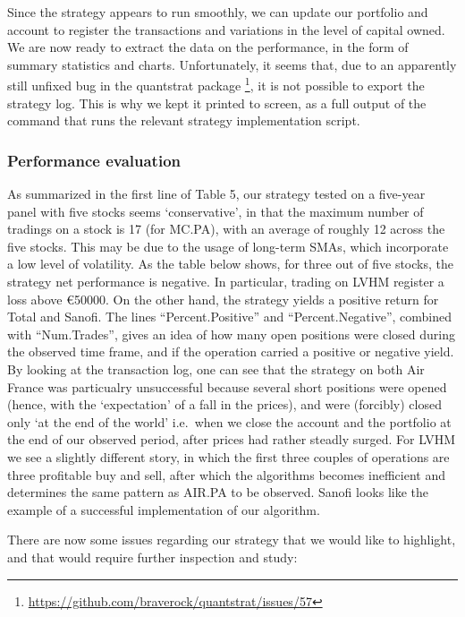 \documentclass[
  11pt,
]{article}
\begin{document}
Since the strategy appears to run smoothly, we can update our portfolio
and account to register the transactions and variations in the level of
capital owned. We are now ready to extract the data on the performance,
in the form of summary statistics and charts. Unfortunately, it seems
that, due to an apparently still unfixed bug in the quantstrat package
\footnote{\url{https://github.com/braverock/quantstrat/issues/57}}, it
is not possible to export the strategy log. This is why we kept it
printed to screen, as a full output of the command that runs the
relevant strategy implementation script.

\hypertarget{performance-evaluation}{%
\subsubsection{Performance evaluation}\label{performance-evaluation}}

As summarized in the first line of Table 5, our strategy tested on a
five-year panel with five stocks seems `conservative', in that the
maximum number of tradings on a stock is 17 (for MC.PA), with an average
of roughly 12 across the five stocks. This may be due to the usage of
long-term SMAs, which incorporate a low level of volatility. As the
table below shows, for three out of five stocks, the strategy net
performance is negative. In particular, trading on LVHM register a loss
above €50000. On the other hand, the strategy yields a positive return
for Total and Sanofi. The lines ``Percent.Positive'' and
``Percent.Negative'', combined with ``Num.Trades'', gives an idea of how
many open positions were closed during the observed time frame, and if
the operation carried a positive or negative yield. By looking at the
transaction log, one can see that the strategy on both Air France was
particualry unsuccessful because several short positions were opened
(hence, with the `expectation' of a fall in the prices), and were
(forcibly) closed only `at the end of the world' i.e.~when we close the
account and the portfolio at the end of our observed period, after
prices had rather steadly surged. For LVHM we see a slightly different
story, in which the first three couples of operations are three
profitable buy and sell, after which the algorithms becomes inefficient
and determines the same pattern as AIR.PA to be observed. Sanofi looks
like the example of a successful implementation of our algorithm.

There are now some issues regarding our strategy that we would like to
highlight, and that would require further inspection and study:
\end{document}
